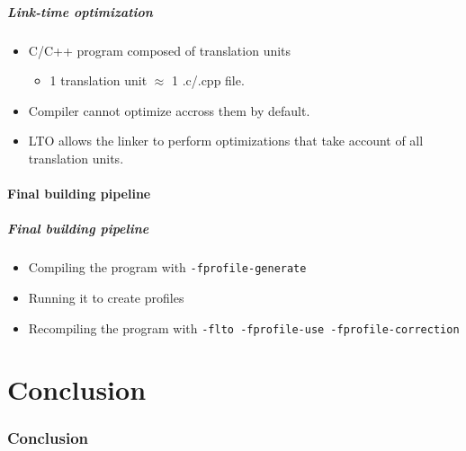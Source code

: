 \documentclass{beamer}
\begin{document}
    \begin{frame}
        \frametitle{Link-time optimization}

        \begin{itemize}
            \item C/C++ program composed of translation units
            \begin{itemize}
                \item 1 translation unit $ \approx $ 1 .c/.cpp file.
            \end{itemize}
            \item Compiler cannot optimize accross them by default.
            \item LTO allows the linker to perform optimizations that take account of all translation units.
        \end{itemize}
    \end{frame}

    \subsection{Final building pipeline}

    \begin{frame}[fragile]
        \frametitle{Final building pipeline}

        \begin{itemize}
            \item Compiling the program with \verb'-fprofile-generate'
            \item Running it to create profiles
            \item Recompiling the program with \verb'-flto -fprofile-use -fprofile-correction'
        \end{itemize}
    \end{frame}

\part{Conclusion}
\section*{Conclusion}
\end{document}
